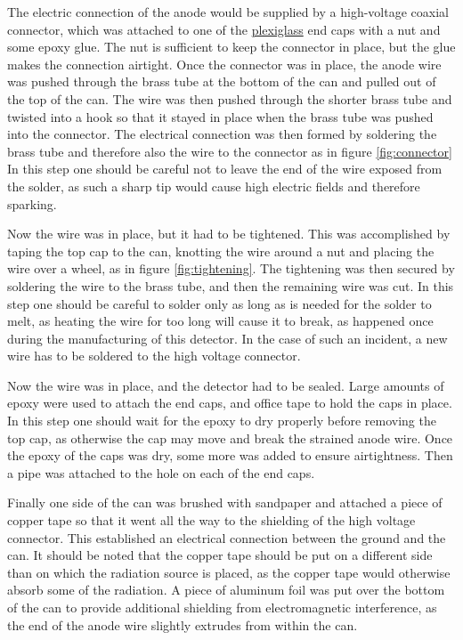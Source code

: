 \documentclass[a4paper]{article}
\begin{document}
The electric connection of the anode would be supplied by a high-voltage coaxial connector, which was attached to one of the
\href{https://en.wikipedia.org/wiki/Poly(methyl_methacrylate)}{plexiglass}
end caps with a nut and some epoxy glue.
The nut is sufficient to keep the connector in place, but the glue makes the connection airtight.
Once the connector was in place, the anode wire was pushed through the brass tube at the bottom of the can and pulled out of the top of the can.
The wire was then pushed through the shorter brass tube and twisted into a hook so that it stayed in place when the brass tube was pushed into the connector.
The electrical connection was then formed by soldering the brass tube and therefore also the wire to the connector as in figure \ref{fig:connector}
In this step one should be careful not to leave the end of the wire exposed from the solder, as such a sharp tip would cause high electric fields and therefore sparking.

Now the wire was in place, but it had to be tightened.
This was accomplished by taping the top cap to the can, knotting the wire around a nut and placing the wire over a wheel, as in figure \ref{fig:tightening}.
The tightening was then secured by soldering the wire to the brass tube, and then the remaining wire was cut.
In this step one should be careful to solder only as long as is needed for the solder to melt, as heating the wire for too long will cause it to break, as happened once during the manufacturing of this detector.
In the case of such an incident, a new wire has to be soldered to the high voltage connector.

Now the wire was in place, and the detector had to be sealed.
Large amounts of epoxy were used to attach the end caps, and office tape to hold the caps in place.
In this step one should wait for the epoxy to dry properly before removing the top cap, as otherwise the cap may move and break the strained anode wire.
Once the epoxy of the caps was dry, some more was added to ensure airtightness.
Then a pipe was attached to the hole on each of the end caps.

Finally one side of the can was brushed with sandpaper and attached a piece of copper tape so that it went all the way to the shielding of the high voltage connector.
This established an electrical connection between the ground and the can.
It should be noted that the copper tape should be put on a different side than on which the radiation source is placed, as the copper tape would otherwise absorb some of the radiation.
A piece of aluminum foil was put over the bottom of the can to provide additional shielding from electromagnetic interference, as the end of the anode wire slightly extrudes from within the can.
\end{document}
